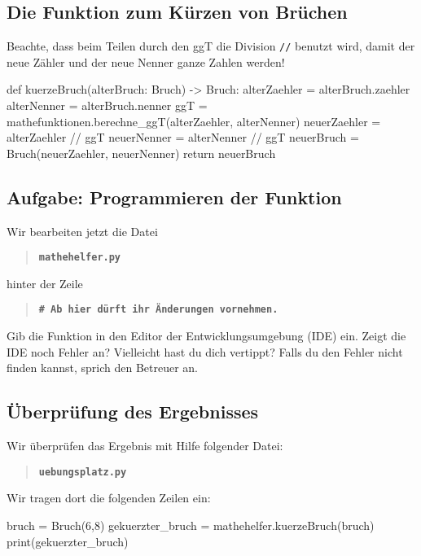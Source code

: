 \pagebreak

\subsection*{Die Funktion zum Kürzen von Brüchen}
\label{sec:FunktionKuerzen}

Beachte, dass beim Teilen durch den ggT die Division \texttt{//} benutzt wird, damit der neue Zähler und der neue Nenner ganze Zahlen werden!

\begin{codePython}
def kuerzeBruch(alterBruch: Bruch) -> Bruch:
	alterZaehler = alterBruch.zaehler
	alterNenner = alterBruch.nenner
	ggT = mathefunktionen.berechne_ggT(alterZaehler, alterNenner)
	neuerZaehler = alterZaehler // ggT
	neuerNenner = alterNenner // ggT
	neuerBruch = Bruch(neuerZaehler, neuerNenner)
	return neuerBruch
\end{codePython}

\subsection*{Aufgabe: Programmieren der Funktion}

Wir bearbeiten jetzt die Datei

\begin{quote}
\textbf{\texttt{mathehelfer.py}}
\end{quote}

hinter der Zeile

\begin{quote}
\textbf{\texttt{\# Ab hier dürft ihr Änderungen vornehmen.}}
\end{quote}

Gib die Funktion in den Editor der Entwicklungsumgebung (IDE) ein. Zeigt die IDE noch Fehler an? Vielleicht hast du dich vertippt? Falls du den Fehler nicht finden kannst, sprich den Betreuer an.

\subsection*{Überprüfung des Ergebnisses}

Wir überprüfen das Ergebnis mit Hilfe folgender Datei:

\begin{quote}
\textbf{\texttt{uebungsplatz.py}}
\end{quote}

Wir tragen dort die folgenden Zeilen ein:

\begin{codePython}
bruch = Bruch(6,8)
gekuerzter_bruch = mathehelfer.kuerzeBruch(bruch)
print(gekuerzter_bruch)
\end{codePython}

